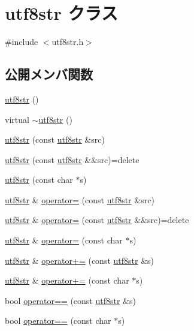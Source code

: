 \hypertarget{classutf8str}{}\section{utf8str クラス}
\label{classutf8str}


{\ttfamily \#include $<$utf8str.\+h$>$}

\subsection*{公開メンバ関数}
\begin{DoxyCompactItemize}
\item 
\hyperlink{classutf8str_ade0a006e67b96bbd32c609df76b26d2c}{utf8str} ()
\item 
virtual \hyperlink{classutf8str_a996c3bcff1a049ff834da89b6d02eda5}{$\sim$utf8str} ()
\item 
\hyperlink{classutf8str_aa91e798ecc3f4da99961ab204c35bcb9}{utf8str} (const \hyperlink{classutf8str}{utf8str} \&src)
\item 
\hyperlink{classutf8str_abdde62e19811801c54236bb7d8322177}{utf8str} (const \hyperlink{classutf8str}{utf8str} \&\&src)=delete
\item 
\hyperlink{classutf8str_a9fde6a70538271f4a9224155d31424c5}{utf8str} (const char $\ast$s)
\item 
\hyperlink{classutf8str}{utf8str} \& \hyperlink{classutf8str_aaff3c4e6bb3aad1659a640194b6f2a6a}{operator=} (const \hyperlink{classutf8str}{utf8str} \&src)
\item 
\hyperlink{classutf8str}{utf8str} \& \hyperlink{classutf8str_addf2fa65d4592e247b5bbd8d500eaa1a}{operator=} (const \hyperlink{classutf8str}{utf8str} \&\&src)=delete
\item 
\hyperlink{classutf8str}{utf8str} \& \hyperlink{classutf8str_a5b70a20e4f7e0bda0a0715aed51db540}{operator=} (const char $\ast$s)
\item 
\hyperlink{classutf8str}{utf8str} \& \hyperlink{classutf8str_a4d93afca84789a1217c3bf130166d1a1}{operator+=} (const \hyperlink{classutf8str}{utf8str} \&s)
\item 
\hyperlink{classutf8str}{utf8str} \& \hyperlink{classutf8str_ad18240fdd48e3afef25e462536742b1a}{operator+=} (const char $\ast$s)
\item 
bool \hyperlink{classutf8str_a1e48c81428d5876e2072095efb51573b}{operator==} (const \hyperlink{classutf8str}{utf8str} \&s)
\item 
bool \hyperlink{classutf8str_a166f6a37d29e7e301240bfee8b97473e}{operator==} (const char $\ast$s)

\end{DoxyCompactItemize}
